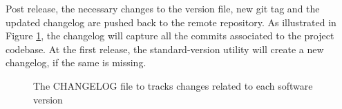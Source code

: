 \vspace{0.5cm}
\lstset{style=mystyle}

\vspace{0.5cm}

Post release, the necessary changes to the version file, new git tag and the updated changelog are pushed back to the  
remote repository. As illustrated in Figure \ref{fig:Changelog}, the changelog will capture all the commits associated to the project codebase. At the first release, the standard-version utility will create a new changelog, if the same is missing.
\vspace{0.5cm}
\begin{figure}[H]
%
\caption[The CHANGELOG.md file]{The CHANGELOG file to tracks changes related to each software version}
\label{fig:Changelog}
\end{figure}
\vspace{0.5cm}



















\clearpage\null\thispagestyle{empty}